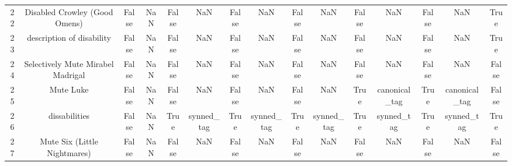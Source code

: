 \begin{table}[h!]
{\begin{tabular}{|c|c|c|c|c|c|c|c|c|c|c|c|c|c|c|}
         22 &                     Disabled Crowley (Good Omens) &                          False &                       NaN &                          False &                       NaN &                          False &                       NaN &                          False &                       NaN &                          False &                       NaN &                          False &                       NaN &                           True \\
         23 &                         description of disability &                          False &                       NaN &                          False &                       NaN &                          False &                       NaN &                          False &                       NaN &                          False &                       NaN &                          False &                       NaN &                           True \\
         24 &                 Selectively Mute Mirabel Madrigal &                          False &                       NaN &                          False &                       NaN &                          False &                       NaN &                          False &                       NaN &                          False &                       NaN &                          False &                       NaN &                          False \\
         25 &                                         Mute Luke &                          False &                       NaN &                          False &                       NaN &                          False &                       NaN &                          False &                       NaN &                           True &             canonical\_tag &                           True &             canonical\_tag &                          False \\
         26 &                                     dissabilities &                          False &                       NaN &                           True &                synned\_tag &                           True &                synned\_tag &                           True &                synned\_tag &                           True &                synned\_tag &                           True &                synned\_tag &                           True \\
         27 &                      Mute Six (Little Nightmares) &                          False &                       NaN &                          False &                       NaN &                          False &                       NaN &                          False &                       NaN &                          False &                       NaN &                          False &                       NaN &                          False \\

\end{tabular}}
\end{table}
